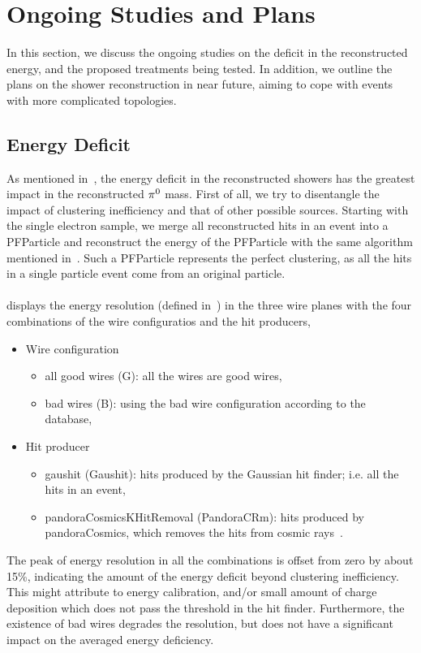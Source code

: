 \section{Ongoing Studies and Plans}
\label{sec:ongoing}

In this section, we discuss the ongoing studies on the deficit in
the reconstructed energy, and the proposed treatments being
tested.
In addition, we outline the plans on the shower reconstruction in
near future, aiming to cope with events with more complicated
topologies.\\

\subsection{Energy Deficit}
\label{sec:energy_deficit}

As mentioned in~, the energy deficit in the reconstructed
showers has the greatest impact in the reconstructed ${\pi}^0$ mass.
First of all, we try to disentangle the impact of clustering inefficiency
and that of other possible sources.
Starting with the single electron sample,
we merge all reconstructed hits in an event into a PFParticle
and reconstruct the energy of the PFParticle with the same algorithm
mentioned in~.
Such a PFParticle represents the perfect clustering, as all the hits
in a single particle event come from an original particle.\\
\\
 displays the energy resolution (defined 
in~)
in the three wire planes with the four combinations of the wire configuratios 
and the hit producers,
\begin{itemize}
\item Wire configuration
  \begin{itemize}
  \item all good wires (G): all the wires are good wires,
  \item bad wires (B): using the bad wire configuration according to
        the database,
  \end{itemize}
\item Hit producer
  \begin{itemize}
  \item gaushit (Gaushit): hits produced by the Gaussian hit finder;
        i.e. all the hits in an event,
  \item pandoraCosmicsKHitRemoval (PandoraCRm): hits produced by
        pandoraCosmics, which removes the hits from cosmic rays~\cite{DocDB5828}.
  \end{itemize}
\end{itemize}
The peak of energy resolution in all the combinations is offset
from zero by about 15\%, indicating the amount of the energy deficit
beyond clustering inefficiency.
This might attribute to energy calibration, and/or small amount of 
charge deposition which does not pass the threshold in the hit finder.
Furthermore, the existence of bad wires degrades the resolution, but
does not have a significant impact on the averaged energy deficiency.\\


